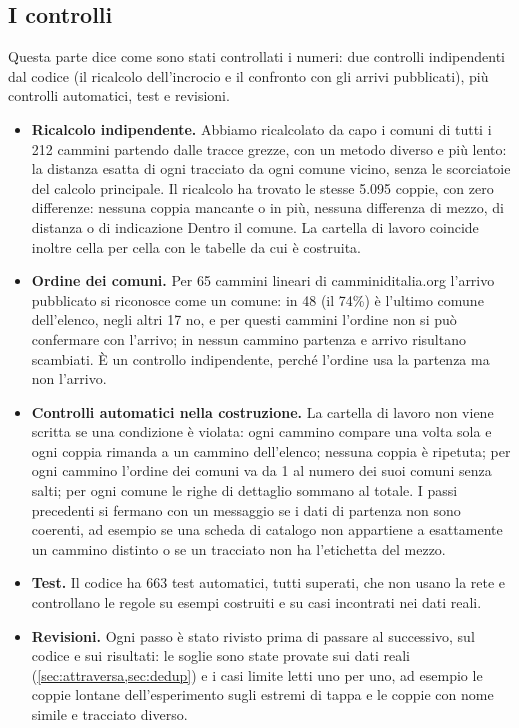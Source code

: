 \subsection{I controlli}\label{sec:controlli}

Questa parte dice come sono stati controllati i numeri: due controlli indipendenti dal codice (il ricalcolo dell'incrocio e il confronto con gli arrivi pubblicati), più controlli automatici, test e revisioni.

\begin{itemize}
\item \textbf{Ricalcolo indipendente.} Abbiamo ricalcolato da capo i comuni di tutti i 212 cammini partendo dalle tracce grezze, con un metodo diverso e più lento: la distanza esatta di ogni tracciato da ogni comune vicino, senza le scorciatoie del calcolo principale. Il ricalcolo ha trovato le stesse 5.095 coppie, con zero differenze: nessuna coppia mancante o in più, nessuna differenza di mezzo, di distanza o di indicazione Dentro il comune. La cartella di lavoro coincide inoltre cella per cella con le tabelle da cui è costruita.
\item \textbf{Ordine dei comuni.} Per 65 cammini lineari di camminiditalia.org l'arrivo pubblicato si riconosce come un comune: in 48 (il 74\%) è l'ultimo comune dell'elenco, negli altri 17 no, e per questi cammini l'ordine non si può confermare con l'arrivo; in nessun cammino partenza e arrivo risultano scambiati. È un controllo indipendente, perché l'ordine usa la partenza ma non l'arrivo.
\item \textbf{Controlli automatici nella costruzione.} La cartella di lavoro non viene scritta se una condizione è violata: ogni cammino compare una volta sola e ogni coppia rimanda a un cammino dell'elenco; nessuna coppia è ripetuta; per ogni cammino l'ordine dei comuni va da 1 al numero dei suoi comuni senza salti; per ogni comune le righe di dettaglio sommano al totale. I passi precedenti si fermano con un messaggio se i dati di partenza non sono coerenti, ad esempio se una scheda di catalogo non appartiene a esattamente un cammino distinto o se un tracciato non ha l'etichetta del mezzo.
\item \textbf{Test.} Il codice ha 663 test automatici, tutti superati, che non usano la rete e controllano le regole su esempi costruiti e su casi incontrati nei dati reali.
\item \textbf{Revisioni.} Ogni passo è stato rivisto prima di passare al successivo, sul codice e sui risultati: le soglie sono state provate sui dati reali (\cref{sec:attraversa,sec:dedup}) e i casi limite letti uno per uno, ad esempio le coppie lontane dell'esperimento sugli estremi di tappa e le coppie con nome simile e tracciato diverso.
\end{itemize}


